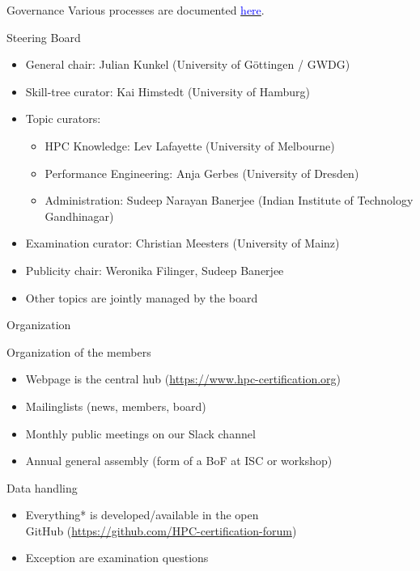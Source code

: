 \documentclass[compress,aspectratio=169]{beamer}
\newcommand{\hrefb}[2]{\href{#1}{\textcolor{blue}{#2}}}
\begin{document}
\begin{frame}{Governance}
	\smallskip
  Various processes are documented \hrefb{https://www.hpc-certification.org/processes/}{here}.
  \begin{block}{Steering Board}
  \vspace*{-0.5em}
  \begin{itemize}
    \item General chair: Julian Kunkel (University of Göttingen / GWDG)
    \item Skill-tree curator: Kai Himstedt (University of Hamburg)
    \item Topic curators:
    \begin{itemize}
      \item HPC Knowledge: Lev Lafayette (University of Melbourne)
      \item Performance Engineering: Anja Gerbes (University of Dresden)
      \item Administration: Sudeep Narayan Banerjee (Indian Institute of Technology Gandhinagar)
    \end{itemize}    
    \item Examination curator: Christian Meesters (University of Mainz)
    \item Publicity chair: Weronika Filinger, Sudeep Banerjee
    \item Other topics are jointly managed by the board
  \end{itemize}
  \end{block}
\end{frame}



\begin{frame}{Organization}
  \begin{block}{Organization of the members}
	\begin{itemize}
  \item Webpage is the central hub (\url{https://www.hpc-certification.org})
  \item Mailinglists (news, members, board)
	\item Monthly public meetings on our Slack channel
  \item Annual general assembly (form of a BoF at ISC or workshop)
  \end{itemize}
  \end{block}

  \begin{block}{Data handling}
    \begin{itemize}
      \item Everything* is developed/available in the open \\
        GitHub (\url{https://github.com/HPC-certification-forum})
      \item Exception are examination questions
    \end{itemize}
  \end{block}
\end{frame}
\end{document}
